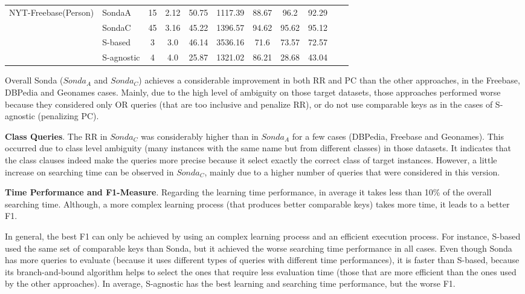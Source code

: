 \begin{center}
\begin{table*}[h]
\begin{tabular}{|c|l|c|c|c|c|c|c|c|c|c|}
\multirow{4}{*}{NYT-Freebase(Person)} & SondaA    & 15 & 2.12   & 50.75  & 1117.39   & 88.67 & 96.2 & 92.29\\
											& SondaC  &   45 & 3.16   & 45.22  & 1396.57  & 94.62 & 95.62 & 95.12\\
											& S-based       & 3 & 3.0   & 46.14  & 3536.16 &   71.6 & 73.57 & 72.57 \\
 											& S-agnostic    & 4 & 4.0   & 25.87  & 1321.02    & 86.21 & 28.68 & 43.04   \\ \hline 								

\end{tabular}  
\end{table*} 
\end{center}

Overall Sonda ($Sonda_A$ and $Sonda_C$) achieves a considerable improvement in both RR and PC than the other approaches, in the Freebase, DBPedia and Geonames cases. Mainly, due to the high level of ambiguity on those target datasets, those approaches performed worse because they considered only OR queries (that are too inclusive and penalize RR), or do not use comparable keys as in the cases of S-agnostic (penalizing PC).  

\textbf{Class Queries}. The RR in $Sonda_C$ was considerably higher than in $Sonda_A$ for a few cases (DBPedia, Freebase and Geonames). This occurred due to class level ambiguity (many instances with the same name but from different classes) in those datasets. It indicates that the class clauses indeed make the queries more precise because it select exactly the correct class of target instances. However, a little increase on searching time can be observed in $Sonda_C$, mainly due to a higher number of queries that were considered in this version.

\textbf{Time Performance and F1-Measure}. Regarding the learning time performance, in average it takes less than 10\% of the overall searching time. Although, a more complex learning process (that produces better comparable keys) takes more time, it leads to a better F1. 

In general, the best F1 can only be achieved by using an complex learning process and an efficient execution process. For instance, S-based used the same set of comparable keys than Sonda, but it achieved the worse searching time performance in all cases. Even though Sonda has more queries to evaluate (because it uses different types of queries with different time performances), it is faster than S-based, because its  branch-and-bound algorithm helps to select the ones that require less evaluation time (those that are more efficient than the ones used by the other approaches).  In average, S-agnostic has the best learning and searching time performance, but the worse F1. 

